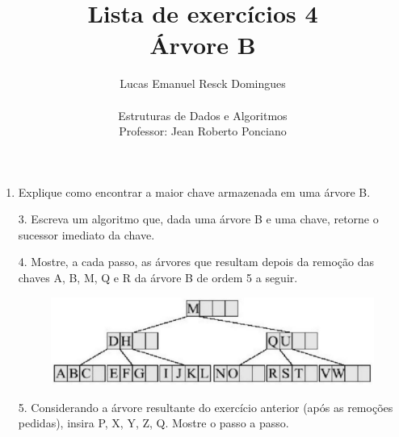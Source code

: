 \documentclass{article}
\title{Lista de exercícios 4 \\
\large Árvore B}
\author{Lucas Emanuel Resck Domingues \\ \\
Estruturas de Dados e Algoritmos \\
Professor: Jean Roberto Ponciano}
\begin{document}
    \maketitle

    \begin{enumerate}
        \item Explique como encontrar a maior chave armazenada em uma árvore B.
        
        \bigskip
        
        

        \bigskip

        \item[3.] Escreva um algoritmo que, dada uma árvore B e uma chave, retorne o sucessor imediato da chave.
        
        \bigskip
        
        

        \bigskip

        \item[4.] Mostre, a cada passo, as árvores que resultam depois da remoção das chaves A, B,
        M, Q e R da árvore B de ordem 5 a seguir.

        \begin{figure}[H]
            \centering
            \includegraphics[width=0.6\linewidth]{tree.png}
        \end{figure}
        
        \bigskip
        
        

        \bigskip

        \item[5.] Considerando a árvore resultante do exercício anterior (após as remoções pedidas),
        insira P, X, Y, Z, Q. Mostre o passo a passo.
        
        \bigskip
        
        

        \bigskip
        
    \end{enumerate}
\end{document}
